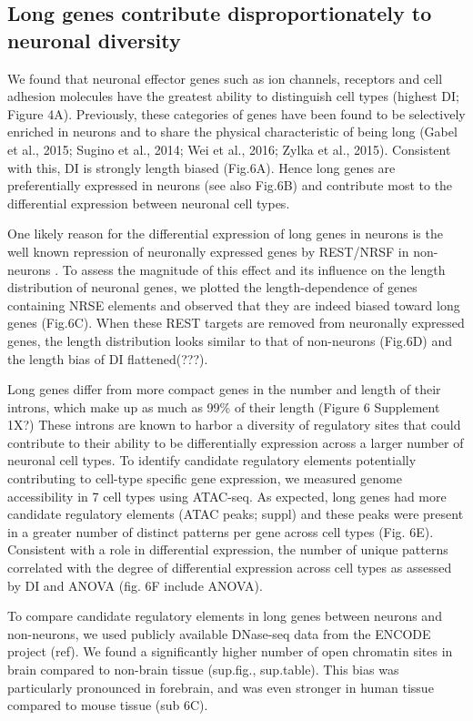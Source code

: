 \subsection{Long genes contribute disproportionately to neuronal diversity}

We found that neuronal effector genes such as ion channels, receptors and cell adhesion molecules have the greatest ability to distinguish cell types (highest DI; Figure 4A). Previously, these categories of genes have been found to be selectively enriched in neurons and to share the physical characteristic of being long (Gabel et al., 2015; Sugino et al., 2014; Wei et al., 2016; Zylka et al., 2015). Consistent with this, DI is strongly length biased (Fig.6A). Hence long genes are preferentially expressed in neurons (see also Fig.6B) and contribute most to the differential expression between neuronal cell types. 

One likely reason for the differential expression of long genes in neurons is the well known repression of neuronally expressed genes by REST/NRSF in non-neurons \cite{RN1}\cite{RN2a}. To assess the magnitude of this effect and its influence on the length distribution of neuronal genes, we plotted the length-dependence of genes containing NRSE elements and observed that they are indeed biased toward long genes (Fig.6C). When these REST targets are removed from neuronally expressed genes, the length distribution looks similar to that of non-neurons (Fig.6D) and the length bias of DI flattened(???).

Long genes differ from more compact genes in the number and length of their introns, which make up as much as 99\% of their length (Figure 6 Supplement 1X?) These introns are known to harbor a diversity of regulatory sites that could contribute to their ability to be differentially expression across a larger number of neuronal cell types. To identify candidate regulatory elements potentially contributing to cell-type specific gene expression, we measured genome accessibility in 7 cell types using ATAC-seq. As expected, long genes had more candidate regulatory elements (ATAC peaks; suppl) and these peaks were present in a greater number of distinct patterns per gene across cell types (Fig. 6E). Consistent with a role in differential expression, the number of unique patterns correlated with the degree of differential expression across cell types as assessed by DI and ANOVA (fig. 6F include ANOVA).

To compare candidate regulatory elements in long genes between neurons and non-neurons, we used publicly available DNase-seq data from the ENCODE project (ref). We found a significantly higher number of open chromatin sites in brain compared to non-brain tissue (sup.fig., sup.table). This bias was  particularly pronounced in forebrain, and was even stronger in human tissue compared to mouse tissue (sub 6C).